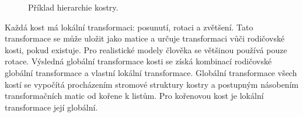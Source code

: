 \begin{figure}[h]
\begin{center}
\caption{Příklad hierarchie kostry.} \label{bone_structure}
\end{center}
\end{figure}

Každá kost má lokální transformaci: posunutí, rotaci a zvětšení. Tato transformace se může uložit jako matice a určuje transformaci vůči rodičovské kosti, pokud existuje. Pro realistické modely člověka se většinou používá pouze rotace. Výsledná globální transformace kosti se získá kombinací rodičovské globální transformace a vlastní lokální transformace. Globální transformace všech kostí se vypočítá procházením stromové struktury kostry a postupným násobením transformačních matic od kořene k listům. Pro kořenovou kost je lokální transformace její globální. 

